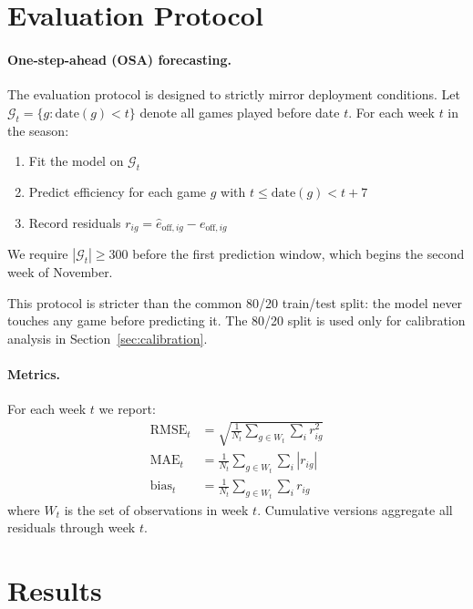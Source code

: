 \documentclass[11pt]{article}
\begin{document}
\section{Evaluation Protocol}
\label{sec:eval}

\paragraph{One-step-ahead (OSA) forecasting.}
The evaluation protocol is designed to strictly mirror deployment conditions.
Let $\mathcal{G}_t = \{g : \text{date}(g) < t\}$ denote all games played before
date $t$.  For each week $t$ in the season:
\begin{enumerate}
  \item Fit the model on $\mathcal{G}_t$
  \item Predict efficiency for each game $g$ with $t \leq \text{date}(g) < t + 7$
  \item Record residuals $r_{ig} = \hat{e}_{\text{off},ig} - e_{\text{off},ig}$
\end{enumerate}
We require $|\mathcal{G}_t| \geq 300$ before the first prediction window, which begins the second week of November.

This protocol is stricter than the common 80/20 train/test split: the model
never touches any game before predicting it.  The 80/20 split is used only for
calibration analysis in Section~\ref{sec:calibration}.

\paragraph{Metrics.}
For each week $t$ we report:
\begin{align*}
  \text{RMSE}_t &= \sqrt{\frac{1}{N_t}\sum_{g \in W_t}\sum_{i} r_{ig}^2} \\
  \text{MAE}_t  &= \frac{1}{N_t}\sum_{g \in W_t}\sum_i |r_{ig}| \\
  \text{bias}_t &= \frac{1}{N_t}\sum_{g \in W_t}\sum_i r_{ig}
\end{align*}
where $W_t$ is the set of observations in week $t$.  Cumulative versions
aggregate all residuals through week $t$.

\section{Results}
\label{sec:results}
\end{document}
